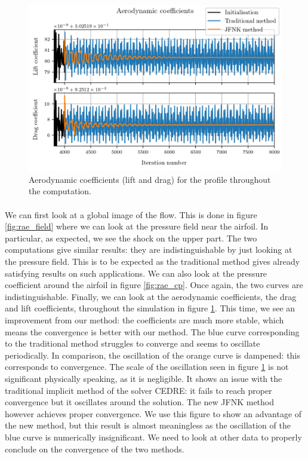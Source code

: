        \begin{figure}
          \centering
          \includegraphics{figures/rae_coefficients.png}
          \caption{Aerodynamic coefficients (lift and drag) for the profile throughout the computation.}
          \label{fig:rae_coefficients}
        \end{figure}

        \paragraph{}
        We can first look at a global image of the flow.
        This is done in figure \ref{fig:rae_field} where we can look at the pressure field near the airfoil.
        In particular, as expected, we see the shock on the upper part.
        The two computations give similar results: they are indistinguishable by just looking at the pressure field.
        This is to be expected as the traditional method gives already satisfying results on such applications.
        We can also look at the pressure coefficient around the airfoil in figure \ref{fig:rae_cp}.
        Once again, the two curves are indistinguishable.
        Finally, we can look at the aerodynamic coefficients, the drag and lift coefficients, throughout the simulation in figure \ref{fig:rae_coefficients}.
        This time, we see an improvement from our method: the coefficients are much more stable, which means the convergence is better with our method.
        The blue curve corresponding to the traditional method struggles to converge and seems to oscillate periodically.
        In comparison, the oscillation of the orange curve is dampened: this corresponds to convergence.
        The scale of the oscillation seen in figure \ref{fig:rae_coefficients} is not significant physically speaking, as it is negligible.
        It shows an issue with the traditional implicit method of the solver CEDRE: it fails to reach proper convergence but it oscillates around the solution.
        The new JFNK method however achieves proper convergence.
        We use this figure to show an advantage of the new method, but this result is almost meaningless as the oscillation of the blue curve is numerically insignificant.
        We need to look at other data to properly conclude on the convergence of the two methods.


